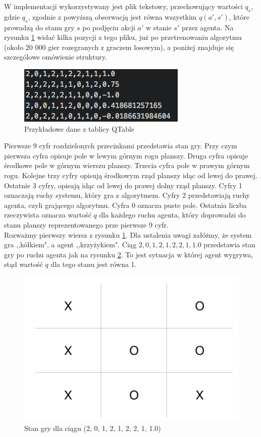 \documentclass[licencjacka]{pracamgr}
\begin{document}
W implementacji wykorzystywany jest plik tekstowy, przechowujący wartości $q_{s}$, gdzie $q_{s}$, zgodnie z powyższą obserwacją jest równa wszystkim  $q(a',s')$, które prowadzą do stanu gry $s$ po podjęciu akcji $a'$ w stanie $s'$ przez agenta. Na rysunku \ref{Rys8} widać kilka pozycji z tego pliku, już po przetrenowaniu algorytmu (około 20 000 gier rozegranych z graczem losowym), a poniżej znajduje się szczególowe omówienie struktury.


\begin{figure}[h!]
	\includegraphics [scale=0.8] {QTable_ex.png}
	\caption{Przykładowe dane z tablicy QTable}
	\label{Rys8}
\end{figure}

Pierwsze 9 cyfr rozdzielonych przecinkami przedstawia stan gry. Przy czym pierwsza cyfra opisuje pole w lewym górnym rogu planszy. Druga cyfra opisuje środkowe pole w górnym wierszu planszy. Trzecia cyfra pole w prawym górnym rogu. Kolejne trzy cyfry opisują środkowym rząd planszy idąc od lewej do prawej. Ostatnie 3 cyfry, opisują idąc od lewej do prawej dolny rząd planszy.  Cyfry 1 oznaczają ruchy systemu, który gra z algorytmem. Cyfry 2 przedstawiają ruchy agenta, czyli grającego algorytmu. Cyfra 0 oznacza puste pole. Ostatnia liczba rzeczywista oznacza wartość  $q$ dla każdego ruchu agenta, który doprowadzi do stanu planszy reprezentowanego prze pierwsze 9 cyfr.\\ 

Rozważmy pierwszy wiersz z rysunku \ref{Rys8}. Dla ustalenia uwagi załóżmy, że system gra ,,kółkiem", a agent ,,krzyżykiem". Ciąg $2, 0, 1, 2, 1, 2,  2, 1, 1.0$ przedstawia stan gry po ruchu agenta jak na rysunku \ref{Rys9}. To jest sytuacja w której agent wygrywa, stąd wartość $q$ dla tego stanu jest równa 1. 

\begin{figure}[h!]
	\includegraphics [scale=0.22] {ttt_1.png}
	\caption{Stan gry dla ciągu (2, 0, 1, 2, 1, 2,  2, 1, 1.0)}
	\label{Rys9}
\end{figure}
\end{document}
